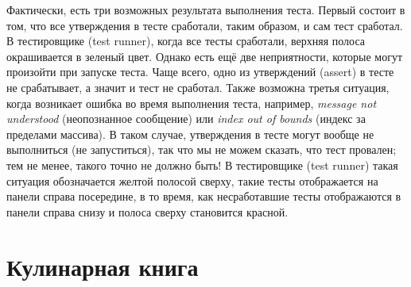 \documentclass[a4paper,10pt,twoside]{book}
\begin{document}
Фактически, есть три возможных результата выполнения теста.
Первый состоит в том, что все утверждения в тесте сработали,
таким образом, и сам тест сработал. В тестировщике (test runner), когда все тесты сработали,
верхняя полоса окрашивается в зеленый цвет.
Однако есть ещё две неприятности, которые могут произойти при запуске теста.
Чаще всего, одно из утверждений (assert) в тесте не срабатывает, а значит и тест не сработал.
Также возможна третья ситуация, когда возникает ошибка во время выполнения теста,
например, \emph{message not understood} (неопознанное сообщение)
или \emph{index out of bounds} (индекс за пределами массива).
В таком случае, утверждения в тесте могут вообще не выполниться (не запуститься),
так что мы не можем сказать, что тест провален; тем не менее, такого точно не должно быть!
В тестировщике (test runner) такая ситуация обозначается желтой полосой сверху,
такие тесты отображается на панели справа посередине, в то время, как несработавшие тесты отображаются в панели справа снизу и полоса сверху становится красной.


\section{Кулинарная книга \SUnit}
\end{document}
